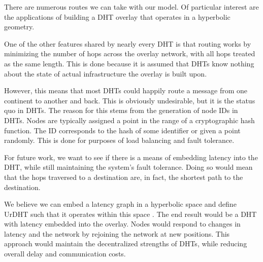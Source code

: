 \documentclass[11pt,conference]{IEEEtran}
\begin{document}

There are numerous routes we can take with our model.
Of particular interest are the applications of building a DHT overlay that operates in a hyperbolic geometry.

One of the other features shared by nearly every DHT is that routing works by minimizing the number of hops across the overlay network, with all hops treated as the same length.
This is done because it is assumed that DHTs know nothing about the state of actual infrastructure the overlay is built upon.

However, this means that most DHTs could happily route a message from one continent to another and back.
This is obviously undesirable, but it is the status quo in DHTs.
The reason for this stems from the generation of node IDs in DHTs. 
Nodes are typically assigned a point in the range of a cryptographic hash function. 
The ID corresponds to the hash of some identifier or given a point randomly.
This is done for purposes of load balancing and fault tolerance.

For future work, we want to see if there is a means of embedding latency into the DHT, while still maintaining the system's fault tolerance.
Doing so would mean that the hops traversed to a destination are, in fact, the shortest path to the destination.

We believe we can embed a latency graph in a hyperbolic space and define UrDHT such that it operates within this space \cite{kleinberg2007geographic} \cite{cvetkovski2009hyperbolic}.
The end result would be a DHT with latency embedded into the overlay.
Nodes would respond to changes in latency and the network by rejoining the network at new positions.
This approach would maintain the decentralized strengths of DHTs, while reducing overall delay and communication costs.






\end{document}

